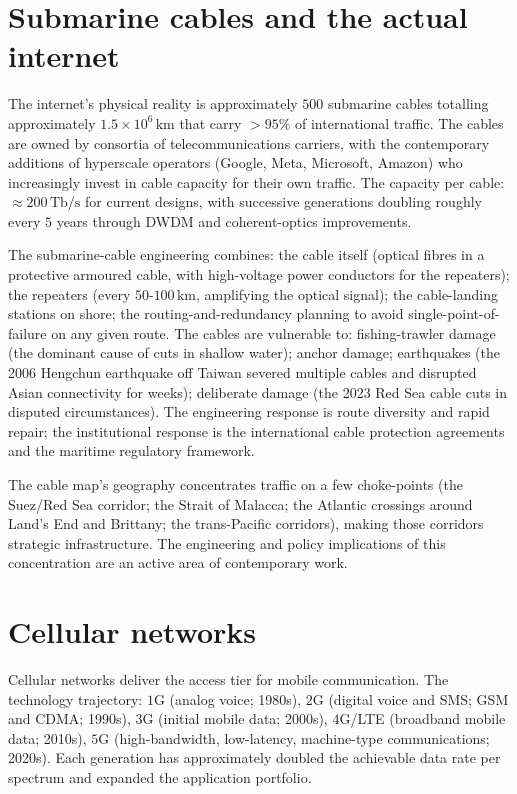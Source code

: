 \section{Submarine cables and the actual internet}

The internet's physical reality is approximately $500$ submarine cables totalling approximately $1.5 \times 10^6\,\text{km}$ that carry $>95\%$ of international traffic. The cables are owned by consortia of telecommunications carriers, with the contemporary additions of hyperscale operators (Google, Meta, Microsoft, Amazon) who increasingly invest in cable capacity for their own traffic. The capacity per cable: $\approx 200\,\text{Tb/s}$ for current designs, with successive generations doubling roughly every $5$ years through DWDM and coherent-optics improvements.

The submarine-cable engineering combines: the cable itself (optical fibres in a protective armoured cable, with high-voltage power conductors for the repeaters); the repeaters (every $50$-$100\,\text{km}$, amplifying the optical signal); the cable-landing stations on shore; the routing-and-redundancy planning to avoid single-point-of-failure on any given route. The cables are vulnerable to: fishing-trawler damage (the dominant cause of cuts in shallow water); anchor damage; earthquakes (the 2006 Hengchun earthquake off Taiwan severed multiple cables and disrupted Asian connectivity for weeks); deliberate damage (the 2023 Red Sea cable cuts in disputed circumstances). The engineering response is route diversity and rapid repair; the institutional response is the international cable protection agreements and the maritime regulatory framework.

The cable map's geography concentrates traffic on a few choke-points (the Suez/Red Sea corridor; the Strait of Malacca; the Atlantic crossings around Land's End and Brittany; the trans-Pacific corridors), making those corridors strategic infrastructure. The engineering and policy implications of this concentration are an active area of contemporary work.

\section{Cellular networks}

Cellular networks deliver the access tier for mobile communication. The technology trajectory: $1$G (analog voice; 1980s), $2$G (digital voice and SMS; GSM and CDMA; 1990s), $3$G (initial mobile data; 2000s), $4$G/LTE (broadband mobile data; 2010s), $5$G (high-bandwidth, low-latency, machine-type communications; 2020s). Each generation has approximately doubled the achievable data rate per spectrum and expanded the application portfolio.

